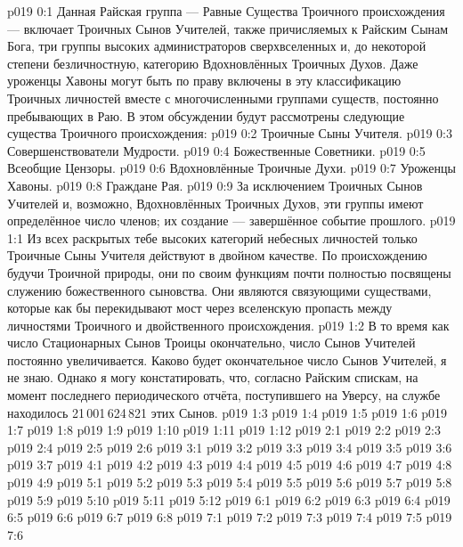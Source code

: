 \author{Божественный Советник}
\vs p019 0:1 Данная Райская группа --- Равные Существа Троичного происхождения --- включает Троичных Сынов Учителей, также причисляемых к Райским Сынам Бога, три группы высоких администраторов сверхвселенных и, до некоторой степени безличностную, категорию Вдохновлённых Троичных Духов. Даже уроженцы Хавоны могут быть по праву включены в эту классификацию Троичных личностей вместе с многочисленными группами существ, постоянно пребывающих в Раю. В этом обсуждении будут рассмотрены следующие существа Троичного происхождения:
\vs p019 0:2  Троичные Сыны Учителя.
\vs p019 0:3  Совершенствователи Мудрости.
\vs p019 0:4  Божественные Советники.
\vs p019 0:5  Всеобщие Цензоры.
\vs p019 0:6  Вдохновлённые Троичные Духи.
\vs p019 0:7  Уроженцы Хавоны.
\vs p019 0:8  Граждане Рая.
\vs p019 0:9 \pc За исключением Троичных Сынов Учителей и, возможно, Вдохновлённых Троичных Духов, эти группы имеют определённое число членов; их создание --- завершённое событие прошлого.
\vs p019 1:1 Из всех раскрытых тебе высоких категорий небесных личностей только Троичные Сыны Учителя действуют в двойном качестве. По происхождению будучи Троичной природы, они по своим функциям почти полностью посвящены служению божественного сыновства. Они являются связующими существами, которые как бы перекидывают мост через вселенскую пропасть между личностями Троичного и двойственного происхождения.
\vs p019 1:2 В то время как число Стационарных Сынов Троицы окончательно, число Сынов Учителей постоянно увеличивается. Каково будет окончательное число Сынов Учителей, я не знаю. Однако я могу констатировать, что, согласно Райским спискам, на момент последнего периодического отчёта, поступившего на Уверсу, на службе находилось 21\,001\,624\,821 этих Сынов.
\vs p019 1:3 
\vs p019 1:4 
\vs p019 1:5 
\vs p019 1:6 
\vs p019 1:7 \pc 
\vs p019 1:8 
\vs p019 1:9 
\vs p019 1:10 
\vs p019 1:11 
\vs p019 1:12 \pc 
{}
\vs p019 2:1 
\vs p019 2:2 
\vs p019 2:3 \pc 
\vs p019 2:4 
\vs p019 2:5 
\vs p019 2:6 \pc 
{}
\vs p019 3:1 
\vs p019 3:2 
\vs p019 3:3 
\vs p019 3:4 \pc 
\vs p019 3:5 
\vs p019 3:6 \pc 
\vs p019 3:7 
\vs p019 4:1 
\vs p019 4:2 
\vs p019 4:3 
\vs p019 4:4 \pc 
\vs p019 4:5 \pc 
\vs p019 4:6 
\vs p019 4:7 
\vs p019 4:8 \pc 
\vs p019 4:9 
\vs p019 5:1 
\vs p019 5:2 
\vs p019 5:3 
\vs p019 5:4 
\vs p019 5:5 \pc 
\vs p019 5:6 
\vs p019 5:7 
\vs p019 5:8 \pc 
\vs p019 5:9 
\vs p019 5:10 
\vs p019 5:11 
\vs p019 5:12 
\vs p019 6:1 
\vs p019 6:2 
\vs p019 6:3 \pc 
\vs p019 6:4 \pc 
\vs p019 6:5 
\vs p019 6:6 
\vs p019 6:7 
\vs p019 6:8 
\vs p019 7:1 
\vs p019 7:2 \pc 
\vs p019 7:3 \pc 
\vs p019 7:4 
\vs p019 7:5 
\vsetoff
\vs p019 7:6 
\quizlink
